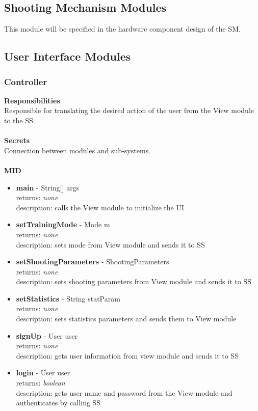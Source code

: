 \documentclass[11pt]{article}
\begin{document}
\subsection{Shooting Mechanism Modules}
This module will be specified in the hardware component design of the SM.
\subsection{User Interface Modules}
\subsubsection*{Controller}
\textbf{Responsibilities} \\
Responsible for translating the desired action of the user from the View module to the SS. \\ \\
\textbf{Secrets} \\
Connection between modules and sub-systems. \\ \\
\textbf{MID}
\begin{itemize}
\item \textbf{main} - String[] args \\ returns: \textit{none} \\ description: calls the View module to initialize the UI
\item \textbf{setTrainingMode} - Mode m \\ returns: \textit{none} \\ description: sets mode from View module and sends it to SS
\item \textbf{setShootingParameters} - ShootingParameters \\ returns: \textit{none} \\ description: sets shooting parameters from View module and sends it to SS
\item \textbf{setStatistics} - String statParam \\ returns: \textit{none} \\ description: sets statistics parameters and sends them to View module
\item \textbf{signUp} - User user \\ returns: \textit{none} \\ description: gets user information from view module and sends it to SS
\item \textbf{login} - User user \\ returns: \textit{boolean} \\ description: gets user name and password from the View module and authenticates by calling SS
\end{itemize}
\end{document}
